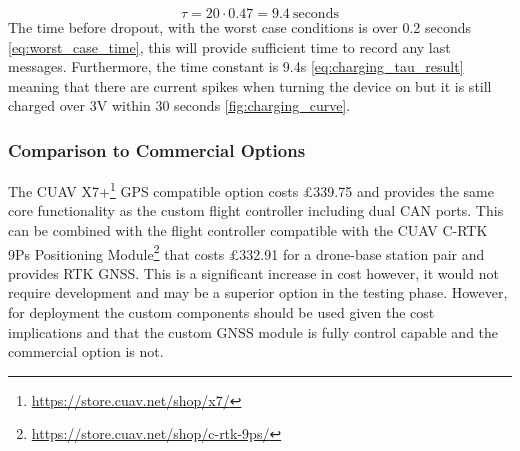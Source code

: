 \begin{equation}
\tau = 20 \cdot 0.47 = 9.4\ \text{seconds}
\label{eq:charging_tau_result}
\end{equation}
The time before dropout, with the worst case conditions is over 0.2 seconds \ref{eq:worst_case_time}, this will provide sufficient time to record any last messages. Furthermore, the time constant is 9.4s \ref{eq:charging_tau_result} meaning that there are current spikes when turning the device on but it is still charged over 3V within 30 seconds \ref{fig:charging_curve}.

\subsubsection{Comparison to Commercial Options}\label{sub_sub_section:tgt_commercial_options}

The CUAV X7+\footnote{\url{https://store.cuav.net/shop/x7/}} GPS compatible option costs £339.75 and provides the same core functionality as the custom flight controller including dual \gls{CAN} ports. This can be combined with the flight controller compatible with the CUAV C-RTK 9Ps Positioning Module\footnote{\url{https://store.cuav.net/shop/c-rtk-9ps/}} that costs £332.91 for a drone-base station pair and provides \gls{RTK} \gls{GNSS}. This is a significant increase in cost however, it would not require development and may be a superior option in the testing phase. However, for deployment the custom components should be used given the cost implications and that the custom \gls{GNSS} module is fully control capable and the commercial option is not. 

